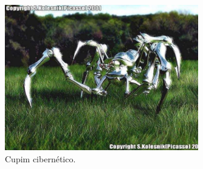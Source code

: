 



\begin{figure}[ht]
\centering
\includegraphics[width=0.75\textwidth]{Cap2/spiderrobot}
\caption{Cupim cibernético.}\label{FDIII}
\end{figure}

